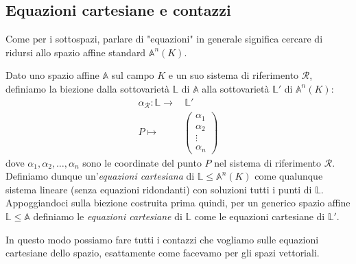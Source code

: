 \documentclass[11pt]{scrartcl}
\renewcommand{\AA}{\mathbb{A}}
\begin{document}
   	 \subsection{Equazioni cartesiane e contazzi}
   	 
   	 Come per i sottospazi, parlare di "equazioni" in generale significa cercare di ridursi allo spazio affine standard $\AA^n(K)$. 
   	 \begin{definition}
   	 	Dato uno spazio affine $\AA$ sul campo $K$ e un suo sistema di riferimento $\mathcal{R}$, definiamo la biezione dalla sottovarietà $\mathbb{L}$ di $\AA$ alla sottovarietà $\mathbb{L}'$ di $\AA^n(K)$:
   	 	\begin{align*}
   	 		\alpha_\mathcal{R}:\mathbb{L} \longrightarrow &\, \mathbb{L}' \\
   	 		P \longmapsto & \begin{pmatrix}
   	 			\alpha_1 \\
   	 			\alpha_2 \\
   	 			\vdots \\
   	 			\alpha_n
   	 		\end{pmatrix}
   	 	\end{align*}
   	 	dove $\alpha_1,\alpha_2,\dots,\alpha_n$ sono le coordinate del punto $P$ nel sistema di riferimento $\mathcal{R}$. \\
   	 	Definiamo dunque un'\textit{equazioni cartesiana} di $\mathbb{L}\le \AA^n(K)$ come qualunque sistema lineare (senza equazioni ridondanti) con soluzioni tutti i punti di $\mathbb{L}$. Appoggiandoci sulla biezione costruita prima quindi, per un generico spazio affine $\mathbb{L}\le \mathbb{A}$ definiamo le \textit{equazioni cartesiane} di $\mathbb{L}$ come le equazioni cartesiane di $\mathbb{L}'$.
   	 \end{definition}
   	 In questo modo possiamo fare tutti i contazzi che vogliamo sulle equazioni cartesiane dello spazio, esattamente come facevamo per gli spazi vettoriali.
   	 
\end{document}
